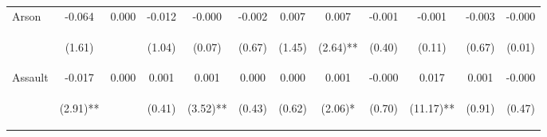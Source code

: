 \begin{tabular}{lccccccccccc}
\noalign{\smallskip}Arson & -0.064 & 0.000 & -0.012 & -0.000 & -0.002 & 0.007 & 0.007 & -0.001 & -0.001 & -0.003 & -0.000\\
 & \begin{footnotesize}(1.61)\end{footnotesize} & \begin{footnotesize}\end{footnotesize} & \begin{footnotesize}(1.04)\end{footnotesize} & \begin{footnotesize}(0.07)\end{footnotesize} & \begin{footnotesize}(0.67)\end{footnotesize} & \begin{footnotesize}(1.45)\end{footnotesize} & \begin{footnotesize}(2.64)**\end{footnotesize} & \begin{footnotesize}(0.40)\end{footnotesize} & \begin{footnotesize}(0.11)\end{footnotesize} & \begin{footnotesize}(0.67)\end{footnotesize} & \begin{footnotesize}(0.01)\end{footnotesize}\\
\noalign{\smallskip}Assault & -0.017 & 0.000 & 0.001 & 0.001 & 0.000 & 0.000 & 0.001 & -0.000 & 0.017 & 0.001 & -0.000\\
 & \begin{footnotesize}(2.91)**\end{footnotesize} & \begin{footnotesize}\end{footnotesize} & \begin{footnotesize}(0.41)\end{footnotesize} & \begin{footnotesize}(3.52)**\end{footnotesize} & \begin{footnotesize}(0.43)\end{footnotesize} & \begin{footnotesize}(0.62)\end{footnotesize} & \begin{footnotesize}(2.06)*\end{footnotesize} & \begin{footnotesize}(0.70)\end{footnotesize} & \begin{footnotesize}(11.17)**\end{footnotesize} & \begin{footnotesize}(0.91)\end{footnotesize} & \begin{footnotesize}(0.47)\end{footnotesize}\\

\end{tabular}
